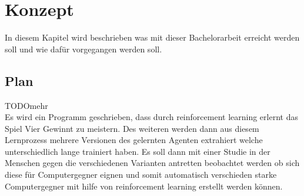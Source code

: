 \chapter{Konzept}%
       

\label{cha:Konzept}

In diesem Kapitel wird beschrieben was mit dieser Bachelorarbeit erreicht werden soll und wie dafür vorgegangen werden soll.


\section{Plan}
\colorbox{red!30}{TODO}mehr\\
Es wird ein Programm geschrieben, dass durch reinforcement learning erlernt das Spiel Vier Gewinnt zu meistern. Des weiteren werden dann aus diesem Lernprozess mehrere Versionen des gelernten Agenten extrahiert welche  unterschiedlich lange trainiert haben. Es soll dann mit einer Studie in der Menschen gegen die verschiedenen Varianten antretten beobachtet werden ob sich diese für Computergegner eignen und somit automatisch verschieden starke Computergegner mit hilfe von reinforcement learning erstellt werden können.
